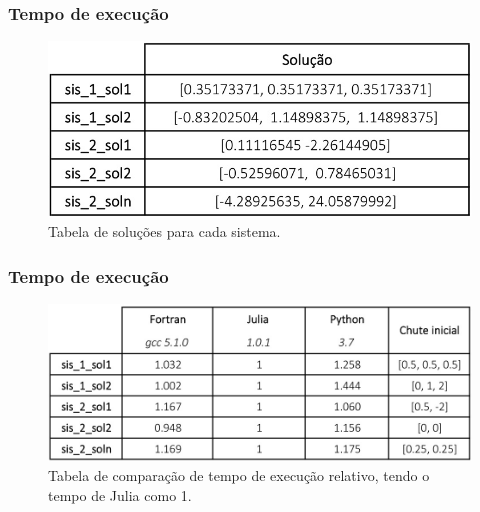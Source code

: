 \documentclass[aspectratio=1610]{beamer}
\begin{document}
\begin{frame}
\frametitle{Tempo de execução}


\begin{figure}
  \centering
  \includegraphics[scale=0.55]{Imagens/sol.jpg}
  \caption{Tabela de soluções para cada sistema.}
\end{figure}


\end{frame}



\begin{frame}
\frametitle{Tempo de execução}


\begin{figure}
  \centering
  \includegraphics[scale=0.55]{Imagens/exe_rel.jpg}
  \caption{Tabela de comparação de tempo de execução relativo, tendo o tempo de Julia como 1.}
\end{figure}


\end{frame}

\end{document}
